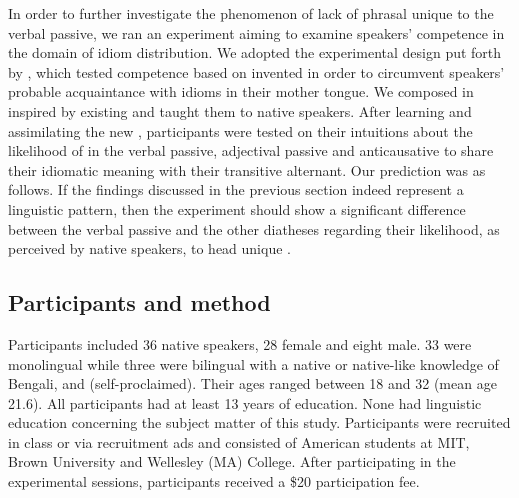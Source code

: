 \documentclass[output=paper]{langsci/langscibook}
\begin{document}
In order to further investigate the phenomenon of lack of phrasal  unique
to the verbal passive, we ran an experiment aiming to examine speakers’
competence in the domain of idiom distribution. We adopted the experimental
design put forth by \textcite{SilHorKluWex2018}, which tested competence based
on invented  in order to circumvent speakers’ probable acquaintance with
idioms in their mother tongue. We composed  in  inspired by
existing   and taught them to native  speakers. After
learning and assimilating the new , participants were tested on their
intuitions about the likelihood of  in the verbal passive, adjectival
passive and anticausative to share their idiomatic meaning with their
transitive alternant. Our prediction was as follows. If the findings discussed
in the previous section indeed represent a linguistic pattern, then the
experiment should show a significant difference between the verbal passive and
the other diatheses regarding their likelihood, as perceived by native
speakers, to head unique .

\subsection{Participants and method}\largerpage[2.6] %

Participants included 36 native  speakers, 28 female and eight male.
33 were monolingual while three were bilingual with a native or native-like
knowledge of Bengali,  and  (self-proclaimed). Their
ages ranged be\-tween 18 and 32 (mean age 21.6).  All participants had at least
13 years of education.  None had linguistic education concerning the subject
matter of this study.  Participants were recruited in class or via recruitment
ads and consisted of American students at MIT, Brown University and Wellesley
(MA) College. After participating in the experimental sessions, participants
received a \$20 participation fee.
\end{document}
